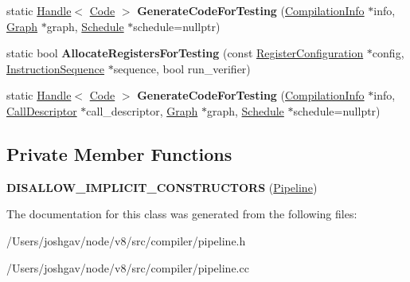 \begin{DoxyCompactItemize}
\item 
static \hyperlink{classv8_1_1internal_1_1_handle}{Handle}$<$ \hyperlink{classv8_1_1internal_1_1_code}{Code} $>$ {\bfseries Generate\+Code\+For\+Testing} (\hyperlink{classv8_1_1internal_1_1_compilation_info}{Compilation\+Info} $\ast$info, \hyperlink{classv8_1_1internal_1_1compiler_1_1_graph}{Graph} $\ast$graph, \hyperlink{classv8_1_1internal_1_1compiler_1_1_schedule}{Schedule} $\ast$schedule=nullptr)\hypertarget{classv8_1_1internal_1_1compiler_1_1_pipeline_a27d009db890793a2ff2c186cde9b3721}{}\label{classv8_1_1internal_1_1compiler_1_1_pipeline_a27d009db890793a2ff2c186cde9b3721}

\item 
static bool {\bfseries Allocate\+Registers\+For\+Testing} (const \hyperlink{classv8_1_1internal_1_1_register_configuration}{Register\+Configuration} $\ast$config, \hyperlink{classv8_1_1internal_1_1compiler_1_1_instruction_sequence}{Instruction\+Sequence} $\ast$sequence, bool run\+\_\+verifier)\hypertarget{classv8_1_1internal_1_1compiler_1_1_pipeline_a55010c13df900af7da725dc7fbde4bc1}{}\label{classv8_1_1internal_1_1compiler_1_1_pipeline_a55010c13df900af7da725dc7fbde4bc1}

\item 
static \hyperlink{classv8_1_1internal_1_1_handle}{Handle}$<$ \hyperlink{classv8_1_1internal_1_1_code}{Code} $>$ {\bfseries Generate\+Code\+For\+Testing} (\hyperlink{classv8_1_1internal_1_1_compilation_info}{Compilation\+Info} $\ast$info, \hyperlink{classv8_1_1internal_1_1compiler_1_1_call_descriptor}{Call\+Descriptor} $\ast$call\+\_\+descriptor, \hyperlink{classv8_1_1internal_1_1compiler_1_1_graph}{Graph} $\ast$graph, \hyperlink{classv8_1_1internal_1_1compiler_1_1_schedule}{Schedule} $\ast$schedule=nullptr)\hypertarget{classv8_1_1internal_1_1compiler_1_1_pipeline_ad745215d2c938744d0086502d06271e3}{}\label{classv8_1_1internal_1_1compiler_1_1_pipeline_ad745215d2c938744d0086502d06271e3}

\end{DoxyCompactItemize}
\subsection*{Private Member Functions}
\begin{DoxyCompactItemize}
\item 
{\bfseries D\+I\+S\+A\+L\+L\+O\+W\+\_\+\+I\+M\+P\+L\+I\+C\+I\+T\+\_\+\+C\+O\+N\+S\+T\+R\+U\+C\+T\+O\+RS} (\hyperlink{classv8_1_1internal_1_1compiler_1_1_pipeline}{Pipeline})\hypertarget{classv8_1_1internal_1_1compiler_1_1_pipeline_a7466bb3575b7a34737b7c8f7b924c966}{}\label{classv8_1_1internal_1_1compiler_1_1_pipeline_a7466bb3575b7a34737b7c8f7b924c966}

\end{DoxyCompactItemize}


The documentation for this class was generated from the following files\+:\begin{DoxyCompactItemize}
\item 
/\+Users/joshgav/node/v8/src/compiler/pipeline.\+h\item 
/\+Users/joshgav/node/v8/src/compiler/pipeline.\+cc\end{DoxyCompactItemize}
